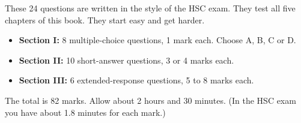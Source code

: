 \providecommand\pracmarks[1]{{\unskip\nobreak\hfil\penalty50\hskip1em\hbox{}\nobreak
  \hfill\mbox{\textcolor{hscmuted}{\small(#1)}}\parfillskip=0pt\finalhyphendemerits=0\par}}
\providecommand\pracblank{\textcolor{hscmuted}{\rule[-2pt]{2.6em}{0.4pt}}}


These 24 questions are written in the style of the HSC exam. They test all five chapters of
this book. They start easy and get harder.
\begin{itemize}
  \item \textbf{Section I:} 8 multiple-choice questions, 1 mark each. Choose A, B, C or D.
  \item \textbf{Section II:} 10 short-answer questions, 3 or 4 marks each.
  \item \textbf{Section III:} 6 extended-response questions, 5 to 8 marks each.
\end{itemize}
The total is 82 marks. Allow about 2 hours and 30 minutes. (In the HSC exam you have about
1.8 minutes for each mark.)

